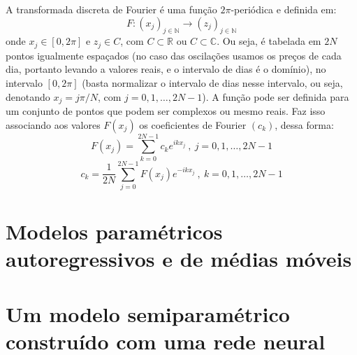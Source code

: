 A transformada discreta de Fourier é uma função $2\pi$-periódica e definida em: \[F:(x_j)_{j \in \mathbb{N}} \rightarrow (z_j)_{j \in \mathbb{N}} \] onde $ x_j \in [0, 2\pi]$ e $ z_j \in C $, com $C \subset \mathbb{R}$ ou $C \subset \mathbb{C}$. Ou seja, é tabelada em $2N$ pontos igualmente espaçados (no caso das oscilações usamos os preços de cada dia, portanto levando a valores reais, e o intervalo de dias é o domínio), no intervalo $[0, 2\pi]$ (basta normalizar o intervalo de dias nesse intervalo, ou seja, denotando $x_j = j\pi/N $, com $j = 0, 1, \dots, 2N-1$). A função pode ser definida para um conjunto de pontos que podem ser complexos ou mesmo reais. Faz isso associando aos valores $F(x_j)$ os coeficientes de Fourier $(c_k)$, dessa forma:
\begin{equation}\label{tfd_1}
F(x_j) = \sum_{k=0}^{2N-1} c_k e^{ikx_j}\ ,\ j=0, 1, \dots, 2N-1
\end{equation}
\begin{equation}\label{tfd_2}
c_k = \frac{1}{2N} \sum_{j=0}^{2N-1} F(x_j) e^{-ikx_j}\ ,\ k=0, 1, \dots, 2N-1
\end{equation}

\section{Modelos paramétricos autoregressivos e de médias móveis}

\section{Um modelo semiparamétrico construído com uma rede neural}